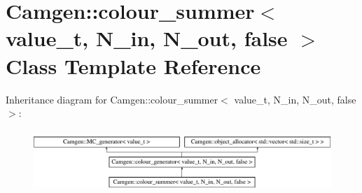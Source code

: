 \hypertarget{a00088}{}\section{Camgen\+:\+:colour\+\_\+summer$<$ value\+\_\+t, N\+\_\+in, N\+\_\+out, false $>$ Class Template Reference}
\label{a00088}
Inheritance diagram for Camgen\+:\+:colour\+\_\+summer$<$ value\+\_\+t, N\+\_\+in, N\+\_\+out, false $>$\+:\begin{figure}[H]
\begin{center}
\leavevmode
\includegraphics[height=2.413793cm]{a00088}
\end{center}
\end{figure}
